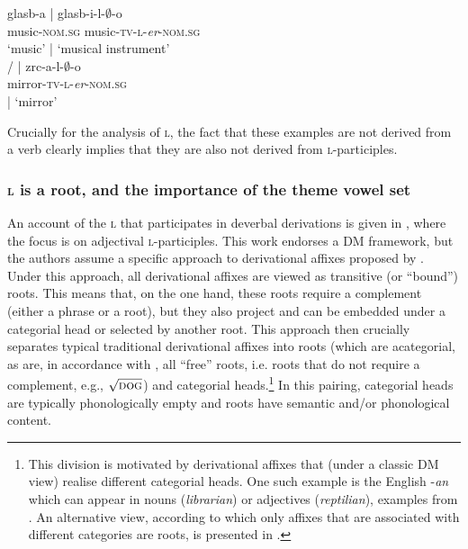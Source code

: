 \documentclass[output=paper,colorlinks,citecolor=brown]{langscibook}
\begin{document}
\ea \label{ex: superčudala}
\ea  \label{ex: glasbilo}
\glll glasb-a | glasb-i-l-$\emptyset$-o\\ 
music-\textsc{nom.sg} {} music-\textsc{tv}-\textsc{l}-\textit{er}-\textsc{nom.sg}\\ 
`music' | `musical{ }instrument' \\
\ex
\glll \hspace{1cm} / \hspace{1.2cm} | zrc-a-l-$\emptyset$-o\\
{} {} {}  {} mirror-\textsc{tv}-\textsc{l}-\textit{er}-\textsc{nom.sg}\\ 
{} {} {} | `mirror' \\
\z 
\z  

\noindent Crucially for the analysis of \textsc{l}, the fact that these examples are not derived from a verb clearly implies that they are also not derived from \textsc{l}-participles. 

\subsubsection{\textsc{l} is a root, and the importance of the theme vowel set \label{sec:dmroot}}

An account of the \textsc{l} that participates in deverbal derivations is given in \citet{simonovicMismas2022}, where the focus is on adjectival \textsc{l}-participles. This work endorses a DM framework, but the authors assume a specific approach to derivational affixes proposed by \citet{lowenstamm2014}. Under this approach, all derivational affixes are viewed as transitive (or ``bound”) roots. This means that, on the one hand, these roots require a complement (either a phrase or a root), but they also project and can be embedded under a categorial head or selected by another root. This approach then crucially separates typical traditional derivational affixes into roots (which are acategorial, as are, in accordance with \citealt{marantz2001words}, all ``free” roots, i.e. roots that do not require a complement, e.g., $\sqrt{\textsc{dog}}$) and categorial heads.\footnote{This division is motivated by derivational affixes that (under a classic DM view) realise different categorial heads. One such example is  the English -\textit{an} which can appear in nouns (\textit{librarian}) or adjectives (\textit{reptilian}), examples from \citet[233]{lowenstamm2014}. An alternative view, according to which only affixes that are associated with different categories are roots, is presented in \citet{creemers2018some}. } In this pairing, categorial heads are typically phonologically empty and roots have semantic and/or phonological content. 
\end{document}

